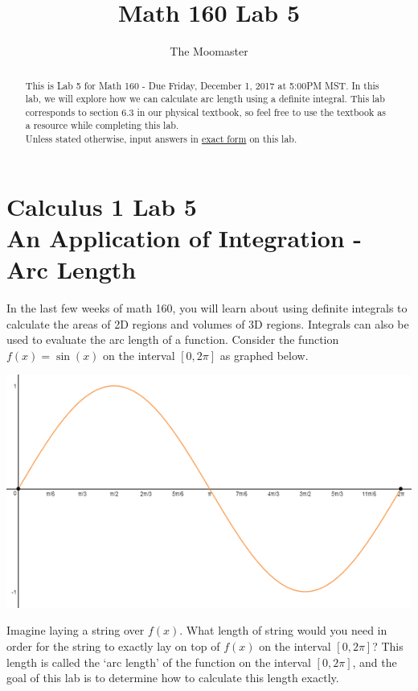 \documentclass[handout,nooutcomes]{ximera}
\title{Math 160 Lab 5}
\author{The Moomaster}
\begin{document}
\section{Calculus 1 Lab 5 \\ An Application of Integration - Arc Length}

\begin{abstract}
This is Lab 5 for Math 160 - Due Friday, December 1, 2017 at 5:00PM MST.  In this lab, we will explore how we can calculate arc length using a definite integral.  This lab corresponds to section 6.3 in our physical textbook, so feel free to use the textbook as a resource while completing this lab.\\

Unless stated otherwise, input answers in \underline{exact form} on this lab.
\end{abstract}
 
\maketitle


In the last few weeks of math 160, you will learn about using definite integrals to calculate the areas of 2D regions and volumes of 3D regions.  Integrals can also be used to evaluate the arc length of a function.  Consider the function $f(x) = \sin(x)$ on the interval $[0,2\pi]$ as graphed below.  \\

\begin{center} \includegraphics{sinxtaketwo.png} \end{center}

Imagine laying a string over $f(x)$.  What length of string would you need in order for the string to exactly lay on top of $f(x)$ on the interval $[0, 2\pi]$?  This length is called the `arc length' of the function on the interval $[0, 2\pi]$, and the goal of this lab is to determine how to calculate this length exactly.  \\
\end{document}
